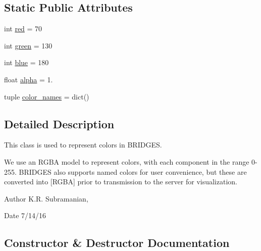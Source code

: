 \subsection*{Static Public Attributes}
\begin{DoxyCompactItemize}
\item 
int \hyperlink{class_bridges_1_1_color_1_1_color_aa2f8facc108ecf452c834b76e5462c34}{red} = 70
\item 
int \hyperlink{class_bridges_1_1_color_1_1_color_aa1709bf6f9e4d5c680fae3d30c4c9e1d}{green} = 130
\item 
int \hyperlink{class_bridges_1_1_color_1_1_color_ae39cfd0803bb01279c3c9c4cad5cd3c9}{blue} = 180
\item 
float \hyperlink{class_bridges_1_1_color_1_1_color_abeff51ca1c74338e4678c2463f92e632}{alpha} = 1.
\item 
tuple \hyperlink{class_bridges_1_1_color_1_1_color_aac2e859047ece53ce3bd7b02d77fbc5d}{color\+\_\+names} = dict()
\end{DoxyCompactItemize}


\subsection{Detailed Description}
This class is used to represent colors in B\+R\+I\+D\+G\+E\+S. 

We use an R\+G\+B\+A model to represent colors, with each component in the range 0-\/255. B\+R\+I\+D\+G\+E\+S also supports named colors for user convenience, but these are converted into \mbox{[}R\+G\+B\+A\mbox{]} prior to transmission to the server for visualization.

\begin{DoxyAuthor}{Author}
K.\+R. Subramanian, 
\end{DoxyAuthor}
\begin{DoxyDate}{Date}
7/14/16 
\end{DoxyDate}


\subsection{Constructor \& Destructor Documentation}
\hypertarget{class_bridges_1_1_color_1_1_color_ad8440a552c6411f70377efc7e6cb91ab}{}
